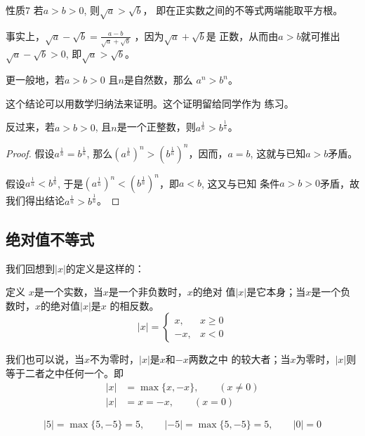 \begin{blk}{性质7}
    若$a>b>0$, 则$\sqrt{a}>\sqrt{b}$，
 即在正实数之间的不等式两端能取平方根。
\end{blk}

事实上，$\sqrt{a}-\sqrt{b}=\frac{a-b}{\sqrt{a}+\sqrt{b}}$
，因为$\sqrt{a}+\sqrt{b}$是
正数，从而由$a>b$就可推出$\sqrt{a}-\sqrt{b}>0$, 即$\sqrt{a}>\sqrt{b}$。

更一般地，若$a>b>0$ 且$n$是自然数，那么
$a^n>b^n$。

这个结论可以用数学归纳法来证明。这个证明留给同学作为
练习。

反过来，若$a>b>0$, 且$n$是一个正整数，则$a^{\tfrac{1}{n}}>b^{\tfrac{1}{n}}$。

\begin{proof}
    假设$a^{\tfrac{1}{n}}=b^{\tfrac{1}{n}}$, 那么$\left(a^{\tfrac{1}{n}}\right)^n>\left(b^{\tfrac{1}{n}}\right)^n$，因而，$a=b$, 这就与已知$a>b$矛盾。

假设$a^{\tfrac{1}{n}}<b^{\tfrac{1}{n}}$, 于是$\left(a^{\tfrac{1}{n}}\right)^n<\left(b^{\tfrac{1}{n}}\right)^n$，即$a<b$, 这又与已知
条件$a>b>0$矛盾，故我们得出结论$a^{\tfrac{1}{n}}>b^{\tfrac{1}{n}}$。
\end{proof}


\subsection{绝对值不等式}
我们回想到$|x|$的定义是这样的：

\begin{blk}{定义}
$x$是一个实数，当$x$是一个非负数时，$x$的绝对
值$|x|$是它本身；当$x$是一个负数时，$x$的绝对值$|x|$是$x$
的相反数。
\begin{equation}
|x|=\begin{cases}
    x,&x\ge 0\\
    -x,&x<0
\end{cases}
\end{equation}
\end{blk}

我们也可以说，当$x$不为零时，$|x|$是$x$和$-x$两数之中
的较大者；当$x$为零时，$|x|$则等于二者之中任何一个。即
\begin{equation}
    \begin{split}
        |x|&=\max\{x,-x\},\qquad (x\ne 0)\\
        |x|&=x=-x,\qquad (x=0)
    \end{split}
\end{equation}

\begin{example}
\[|5|=\max\{5,-5\}=5,\qquad |-5|=\max\{5,-5\}=5,\qquad |0|=0\]
\end{example}

